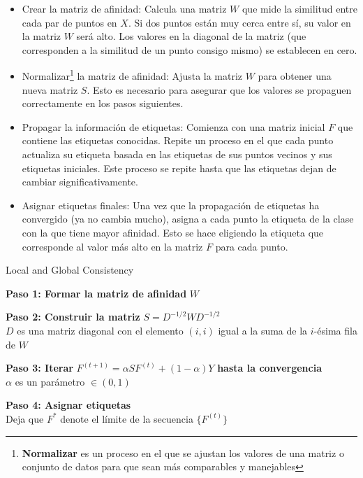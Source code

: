\begin{itemize}
	\item Crear la matriz de afinidad: Calcula una matriz $W$ que mide la similitud entre cada par de puntos en $X$. Si dos puntos están muy cerca entre sí, su valor en la matriz $W$ será alto. Los valores en la diagonal de la matriz (que corresponden a la similitud de un punto consigo mismo) se establecen en cero.
	\item Normalizar\footnote{\textbf{Normalizar} es un proceso en el que se ajustan los valores de una matriz o conjunto de datos para que sean más comparables y manejables} la matriz de afinidad: Ajusta la matriz	$W$ para obtener una nueva matriz $S$. Esto es necesario para asegurar que los valores se propaguen correctamente en los pasos siguientes.
	\item Propagar la información de etiquetas: Comienza con una matriz inicial $F$ que contiene las etiquetas conocidas. Repite un proceso en el que cada punto actualiza su etiqueta basada en las etiquetas de sus puntos vecinos y sus etiquetas iniciales. Este proceso se repite hasta que las etiquetas dejan de cambiar significativamente.
	\item Asignar etiquetas finales: Una vez que la propagación de etiquetas ha convergido (ya no cambia mucho), asigna a cada punto la etiqueta de la clase con la que tiene mayor afinidad. Esto se hace eligiendo la etiqueta que corresponde al valor más alto en la matriz $F$ para cada punto.
\end{itemize}
\begin{algorithm}[H]
\scriptsize
	\caption{Local and Global Consistency}
	\label{alg:LGC}
	
	\BlankLine
	\textbf{Paso 1: Formar la matriz de afinidad} $W$ \\
	
	\BlankLine
	\textbf{Paso 2: Construir la matriz} $S = D^{-1/2} W D^{-1/2}$ \\
	$D$ es una matriz diagonal con el elemento $(i, i)$ igual a la suma de la $i$-ésima fila de $W$
	
	\BlankLine
	\textbf{Paso 3: Iterar} $F^{(t+1)} = \alpha S F^{(t)} + (1 - \alpha) Y$ \textbf{hasta la convergencia} \\
	$\alpha$ es un parámetro $\in (0, 1)$
	
	\BlankLine
	\textbf{Paso 4: Asignar etiquetas} \\
	Deja que $F^*$ denote el límite de la secuencia $\{F^{(t)}\}$ \\
	
	
\end{algorithm}

